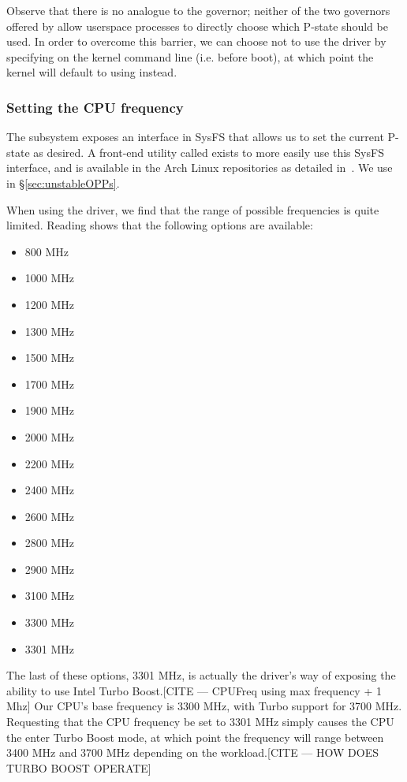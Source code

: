 Observe that there is no analogue to the  governor; neither of
the two governors offered by  allow userspace processes to
directly choose which P-state should be used. In order to overcome this barrier,
we can choose not to use the  driver by specifying
 on the kernel command line (i.e. before boot),
at which point the kernel will default to using  instead.

\subsubsection{Setting the CPU frequency}
\label{sec:cpupower}

The  subsystem exposes an interface in SysFS that allows us to
set the current P-state as desired. A front-end utility called 
exists to more easily use this SysFS interface, and is available in the Arch
Linux repositories as detailed in~\cite{archFrequency}. We use 
in §\ref{sec:unstableOPPs}.

When using the  driver, we find that the range of possible
frequencies is quite limited. Reading  shows that the
following options are available:

\begin{multicols}{3}\raggedcolumns
    \begin{itemize}
        \item 800 MHz
        \item 1000 MHz
        \item 1200 MHz
        \item 1300 MHz
        \item 1500 MHz
        \item 1700 MHz
        \item 1900 MHz
        \item 2000 MHz
        \item 2200 MHz
        \item 2400 MHz
        \item 2600 MHz
        \item 2800 MHz
        \item 2900 MHz
        \item 3100 MHz
        \item 3300 MHz
        \item 3301 MHz
    \end{itemize}
\end{multicols}

The last of these options, 3301 MHz, is actually the driver's way of exposing
the ability to use Intel Turbo Boost.[CITE — CPUFreq using max frequency + 1 Mhz]
Our CPU's base frequency is 3300 MHz,
with Turbo support for 3700 MHz. Requesting that the CPU frequency be set to
3301 MHz simply causes the CPU the enter Turbo Boost mode, at which point the
frequency will range between 3400 MHz and 3700 MHz depending on the
workload.[CITE — HOW DOES TURBO BOOST OPERATE]
